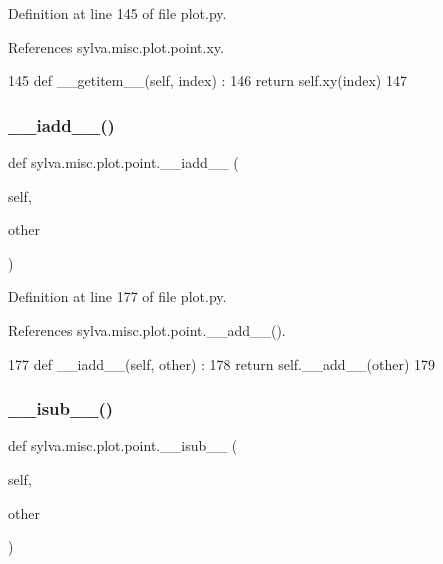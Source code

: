 Definition at line 145 of file plot.\+py.



References sylva.\+misc.\+plot.\+point.\+xy.


\begin{DoxyCode}
145     \textcolor{keyword}{def }\_\_getitem\_\_(self, index) :
146       \textcolor{keywordflow}{return} self.xy(index)
147 
\end{DoxyCode}
\mbox{\label{classsylva_1_1misc_1_1plot_1_1point_a52992e538e21670f48a5ee5d63aafc5c}} 
\subsubsection{\texorpdfstring{\+\_\+\+\_\+iadd\+\_\+\+\_\+()}{\_\_iadd\_\_()}}
{\footnotesize\ttfamily def sylva.\+misc.\+plot.\+point.\+\_\+\+\_\+iadd\+\_\+\+\_\+ (\begin{DoxyParamCaption}\item[{}]{self,  }\item[{}]{other }\end{DoxyParamCaption})}



Definition at line 177 of file plot.\+py.



References sylva.\+misc.\+plot.\+point.\+\_\+\+\_\+add\+\_\+\+\_\+().


\begin{DoxyCode}
177     \textcolor{keyword}{def }\_\_iadd\_\_(self, other) :
178       \textcolor{keywordflow}{return} self.\_\_add\_\_(other)
179 
\end{DoxyCode}
\mbox{\label{classsylva_1_1misc_1_1plot_1_1point_a0f73456638159eb552d6aef70d76ea57}} 
\subsubsection{\texorpdfstring{\+\_\+\+\_\+isub\+\_\+\+\_\+()}{\_\_isub\_\_()}}
{\footnotesize\ttfamily def sylva.\+misc.\+plot.\+point.\+\_\+\+\_\+isub\+\_\+\+\_\+ (\begin{DoxyParamCaption}\item[{}]{self,  }\item[{}]{other }\end{DoxyParamCaption})}



